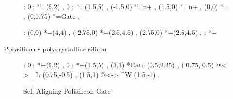 \documentclass[a4paper,12pt]{article}
\begin{document}
\begin{figure}[ht]

\xy<1cm,0cm>:
0 ; *=(5,2)\frm{-} ,
0 ; *=(1.5,5)\frm{-} ,
%
\POS (-1.5,0) *={n+} ,
\POS (1.5,0) *={n+} ,
\POS (0,0) *= ,
\POS (0,1.75) *={Gate} ,
\endxy

\end{figure}

\begin{figure}[ht]

\xy<1cm,0cm>:
(0,0) *=(4,4)\frm{=} ,
(-2.75,0) *=(2.5,4.5)\frm{-} ,
(2.75,0) *=(2.5,4.5)\frm{-} ,
%
 ; *=
\endxy

\end{figure}

Polysilicon - polycrystalline silicon

\begin{figure}[ht]

\xy<1cm,0cm>:
0 ; *=(5,2)\frm{-} ,
0 ; *=(1.5,5)\frm{-} ,
%
\POS (3,3) *{Gate} \ar (0.5,2.25) ,
%
\POS (-0.75,-0.5) \ar @{<->} _{L} (0.75,-0.5) ,
\POS (1.5,1) \ar @{<->} ^{W} (1.5,-1) ,
\endxy

\caption{Self Aligning Polisilicon Gate}

\end{figure}
\end{document}
